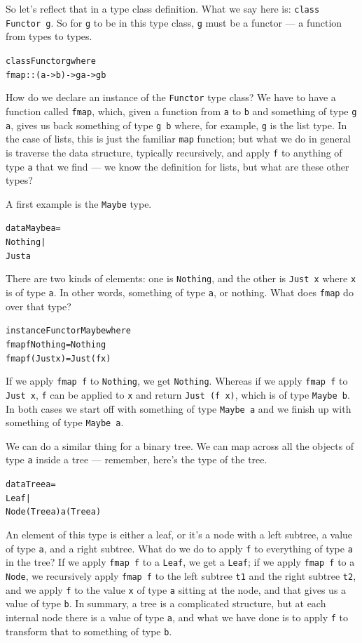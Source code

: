 So let's reflect that in a type class definition. What we say here is: \texttt{class Functor g}. So for \texttt{g} to be in this type class, \texttt{g} must be a functor — a function from types to types. 
\begin{alltt}
class Functor g where
  fmap :: (a -> b) -> g a -> g b
\end{alltt}
How do we declare an instance of the \texttt{Functor} type class? We have to have a function called \texttt{fmap}, which, given a function from \texttt{a} to \texttt{b} and something of type \texttt{g a}, gives us back something of type \texttt{g b} where, for example, \texttt{g} is the list type. In the case of lists, this is just the familiar \texttt{map} function; but what we do in general is traverse the data structure, typically recursively, and apply \texttt{f} to anything of type \texttt{a} that we find — we know the definition for lists, but what are these other types?

A first example is the \texttt{Maybe} type.
\begin{alltt}
data Maybe a =  
  Nothing |
  Just a
\end{alltt}
There are two kinds of elements: one is \texttt{Nothing}, and the other is \texttt{Just x} where \texttt{x} is of type \texttt{a}. In other words, something of type \texttt{a}, or nothing. What does \texttt{fmap} do over that type? 
\begin{alltt}
instance Functor Maybe where
  fmap f Nothing  = Nothing
  fmap f (Just x) = Just (f x)
\end{alltt}
If we apply \texttt{fmap f} to \texttt{Nothing}, we get \texttt{Nothing}. Whereas if we apply \texttt{fmap f} to \texttt{Just x}, \texttt{f} can be applied to \texttt{x} and return \texttt{Just (f x)}, which is of type \texttt{Maybe b}. In both cases we start off with something of type \texttt{Maybe a} and we finish up with something of type \texttt{Maybe a}.

We can do a similar thing for a binary tree. We can map across all the objects of type \texttt{a} inside a tree — remember, here's the type of the tree.
\begin{alltt}
data Tree a =
   Leaf |
   Node (Tree a) a (Tree a)
\end{alltt}
An element of this type is either a leaf, or it's a node with a left subtree, a value of type \texttt{a}, and a right subtree. What do we do to apply \texttt{f} to everything of type \texttt{a} in the tree? If we apply \texttt{fmap f} to a \texttt{Leaf}, we get a \texttt{Leaf}; if we apply \texttt{fmap f} to a \texttt{Node}, we recursively apply \texttt{fmap f} to the left subtree \texttt{t1} and the right subtree \texttt{t2}, and we apply \texttt{f} to the value \texttt{x} of type \texttt{a} sitting at the node, and that gives us a value of type \texttt{b}. In summary, a tree is a complicated structure, but at each internal node there is a value of type \texttt{a}, and what we have done is to apply \texttt{f} to transform that to something of type \texttt{b}. 

